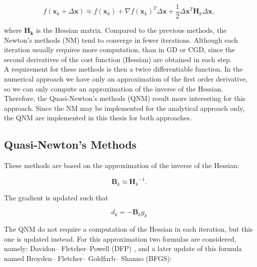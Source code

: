 \begin{equation}
{f(\mathbf{x}_k + \Delta \mathbf{x}) }\approx {f(\mathbf{x}_k) } + {\nabla f(\mathbf{x}_k)^{T} }{\Delta \mathbf{x}} + \frac{1}{2} {\Delta \mathbf{x}^{T} }\mathbf{H}_k {\Delta \mathbf{x}},
\end{equation}

where $\mathbf{H_k}$ is the Hessian matrix.  Compared to the previous methods, the Newton's methods (NM) tend to converge in fewer iterations. Although each iteration usually requires more computation, than in GD or CGD, since the second derivatives of the cost function (Hessian) are obtained in each step. \\
A requirement for these methods is then a twice differentiable function.  
In the numerical approach we have only  an approximation of the first order derivative, so  we can only compute an approximation of the inverse of the Hessian. Therefore, the Quasi-Newton's methods (QNM) result more interesting for this approach. Since the NM may be implemented for the analytical approach only, the QNM are implemented in this thesis for both approaches.


\subsection{Quasi-Newton's Methods}
\label{subsec:quasinewton}


 
These methods are based on the approximation of the inverse of the Hessian:

\begin{equation}
\mathbf{B}_k \approx {\mathbf{H}_k}^{-1}. 
\end{equation}

The gradient is updated such that

\begin{equation}
{d_k = - \mathbf{B}_k  g_k }
\end{equation}



The QNM do not require a computation of the Hessian in each iteration, but this one is updated instead.
For this approximation two formulas are considered, namely: Davidon–
Fletcher–Powell (DFP) \cite{DFP}, and a later update of this formula named Broyden– Fletcher– Goldfarb– Shanno (BFGS)\cite{BFGS}:

